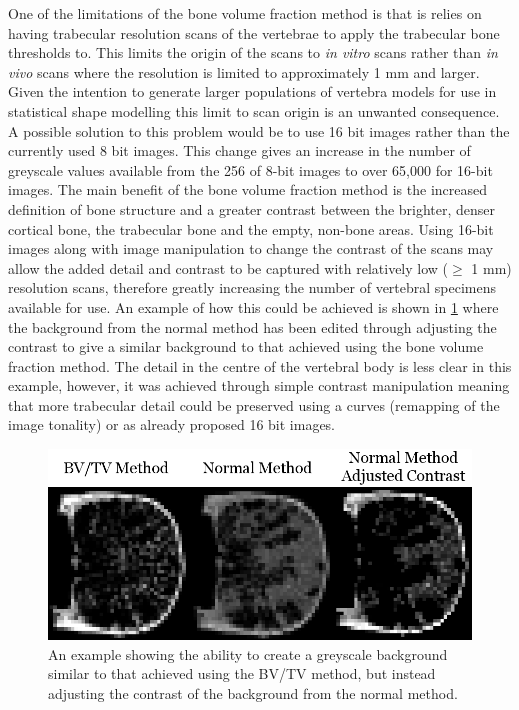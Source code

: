 One of the limitations of the bone volume fraction method is that is relies on
having trabecular resolution scans of the vertebrae to apply the trabecular
bone thresholds to.  This limits the origin of the scans to \textit{in vitro}
scans rather than \textit{in vivo} scans where the resolution is limited to
approximately 1 mm and larger.  Given the intention to generate larger
populations of vertebra models for use in statistical shape modelling this
limit to scan origin is an unwanted consequence.  A possible solution to this
problem would be to use 16 bit images rather than the currently used 8 bit
images.  This change gives an increase in the number of greyscale values
available from the 256 of 8-bit images to over 65,000 for 16-bit images.  The
main benefit of the bone volume fraction method is the increased definition of
bone structure and a greater contrast between the brighter, denser cortical
bone, the trabecular bone and the empty, non-bone areas.  Using 16-bit images
along with image manipulation to change the contrast of the scans may allow the
added detail and contrast to be captured with relatively low ($\geq$ 1 mm)
resolution scans, therefore greatly increasing the number of vertebral
specimens available for use. An example of how this could be achieved is shown
in \cref{fig:adding_contrast} where the background from the normal method has
been edited through adjusting the contrast to give a similar background to that
achieved using the bone volume fraction method. The detail in the centre of the
vertebral body is less clear in this example, however, it was achieved through
simple contrast manipulation meaning that more trabecular detail could be
preserved using a curves (remapping of the image tonality) or as already
proposed 16 bit images.

\begin{figure}[h!]
  \centering
\includegraphics[width=.65\textwidth]{Chapters/Chapter_HT_images/adding_contrast.png}
\caption{An example showing the ability to create a greyscale background similar to that achieved using the BV/TV method, but instead adjusting the contrast of the background from the normal method.}
	\label{fig:adding_contrast}
\end{figure}


